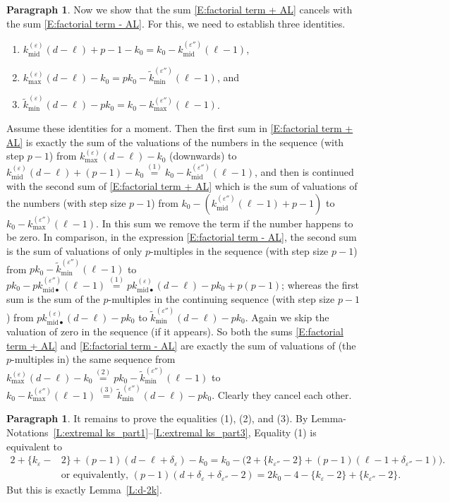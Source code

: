 \documentclass[12pt]{amsart}
\theoremstyle{definition}
\newtheorem{para}[subsection]{Paragraph}
\numberwithin{equation}{subsection}
\newcommand{\midd}{\mathrm{mid}}
\begin{document}
\medskip
\begin{para}
\label{P:para_139}
Now we show that the sum \eqref{E:factorial term + AL} cancels with the sum \eqref{E:factorial term - AL}.
For this, we need to establish three identities.
\begin{enumerate}
\item $k_\midd^{(\varepsilon)} (d-\ell)+p-1 -k_0 =k_0- k_{\midd}^{(\varepsilon'')}(\ell-1)$,
\item 
$k_{\max}^{(\varepsilon)} (d-\ell) -k_0 = pk_0-\tilde  k_{\min}^{(\varepsilon'')}(\ell-1)$, and
\item 
$ \tilde k_{\min}^{(\varepsilon)} (d-\ell) -pk_0=k_0-   k_{\max}^{(\varepsilon'')}(\ell-1) $.
\end{enumerate}
Assume these identities for a moment.
Then the first sum in \eqref{E:factorial term + AL} is exactly the sum of the valuations of the numbers in the sequence (with step $p-1$) from $ k^{(\varepsilon)}_{\max}(d-\ell) - k_0$ (downwards) to $k^{(\varepsilon)}_{\midd}(d-\ell)+(p-1) - k_0 \stackrel{(1)}= k_0 - k_{{\midd}}^{(\varepsilon'')}(\ell-1)$, and then is continued with the second sum of \eqref{E:factorial term + AL} which is the sum of valuations of the numbers (with step size $p-1$) from $k_0 -(k_{{\midd}}^{(\varepsilon'')}(\ell-1)+p-1)$ to $k_0 - k_{\max}^{(\varepsilon'')}(\ell-1)$. In this sum we remove the term if the number happens to be zero.  In comparison, in the expression \eqref{E:factorial term - AL}, the second sum is the sum of valuations of only $p$-multiples in the sequence (with step size $p-1$) from $pk_0-\tilde  k_{\min}^{(\varepsilon'')}(\ell-1)$ to $pk_0 - pk^{(\varepsilon'')}_{\midd \bullet}(\ell-1) 
\stackrel{(1)}=  pk^{(\varepsilon)}_{\midd \bullet}(d-\ell) - pk_0 + p(p-1)$; whereas the first sum is the sum of the $p$-multiples in the continuing sequence (with step size $p-1$) from $
pk^{(\varepsilon)}_{\midd \bullet}(d-\ell) - pk_0$ to $\tilde k^{(\varepsilon'')}_{\min}(d-\ell) - pk_0$. Again we skip the valuation of zero in the sequence (if it appears).
So both the sums \eqref{E:factorial term + AL} and \eqref{E:factorial term - AL} are exactly the sum of valuations of (the $p$-multiples in) the same sequence from $k^{(\varepsilon)}_{\max}(d-\ell) - k_0\stackrel{(2)}= pk_0-\tilde  k_{\min}^{(\varepsilon'')}(\ell-1)$ to $ k_0 - k^{(\varepsilon'')}_{\max}(\ell-1) \stackrel{(3)}=\tilde k^{(\varepsilon'')}_{\min}(d-\ell) - pk_0$. Clearly they cancel each other.
\end{para}

\medskip
\begin{para}
\label{P:para_140}
It remains to prove the equalities (1), (2), and (3).
By Lemma-Notations~\ref{L:extremal ks_part1}--\ref{L:extremal ks_part3}, Equality (1) is equivalent to
\begin{align*}
2+\{k_\varepsilon -&2\} + (p-1)(d-\ell +\delta_\varepsilon) -k_0 = k_0 - \big( 2+\{k_{\varepsilon ''}-2\} + (p-1)(\ell-1 + \delta_{\varepsilon''} -1)\big).
\\
&
\textrm{or equivalently, }(p-1)(d+\delta_\varepsilon + \delta_{\varepsilon''}-2) = 2k_0 -4 -\{k_\varepsilon-2\}+\{k_{\varepsilon''}-2\}.
\end{align*}
But this is exactly Lemma~\ref{L:d-2k}.
\end{para}
\end{document}
